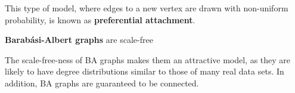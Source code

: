 This type of model, where edges to a new vertex are drawn with non-uniform
probability, is known as \textbf{preferential attachment}.

\begin{theorem}
  \textbf{Barab\'asi-Albert graphs} are scale-free
\end{theorem}

The scale-free-ness of BA graphs makes them an attractive model, as they are likely to have degree
distributions similar to those of many real data sets. In addition, BA graphs are guaranteed to be
connected.

